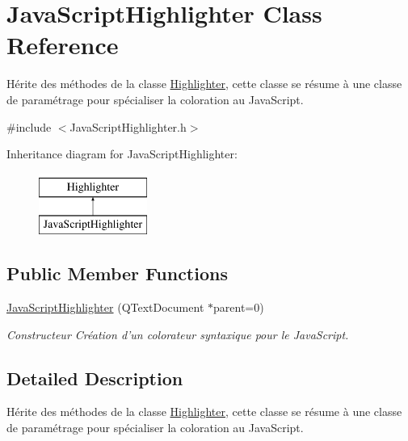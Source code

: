 \hypertarget{class_java_script_highlighter}{
\section{JavaScriptHighlighter Class Reference}
\label{class_java_script_highlighter}
}


Hérite des méthodes de la classe \hyperlink{class_highlighter}{Highlighter}, cette classe se résume à une classe de paramétrage pour spécialiser la coloration au JavaScript.  




{\ttfamily \#include $<$JavaScriptHighlighter.h$>$}

Inheritance diagram for JavaScriptHighlighter:\begin{figure}[H]
\begin{center}
\leavevmode
\includegraphics[height=2.000000cm]{class_java_script_highlighter}
\end{center}
\end{figure}
\subsection*{Public Member Functions}
\begin{DoxyCompactItemize}
\item 
\hyperlink{class_java_script_highlighter_ab1a946f309d3d143e01153379c60a931}{JavaScriptHighlighter} (QTextDocument $\ast$parent=0)
\begin{DoxyCompactList}\small\item\em Constructeur Création d'un colorateur syntaxique pour le JavaScript. \item\end{DoxyCompactList}\end{DoxyCompactItemize}


\subsection{Detailed Description}
Hérite des méthodes de la classe \hyperlink{class_highlighter}{Highlighter}, cette classe se résume à une classe de paramétrage pour spécialiser la coloration au JavaScript. 

